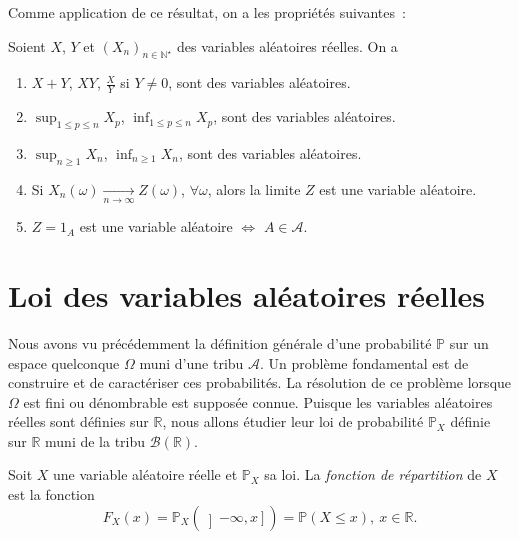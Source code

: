 Comme application de ce résultat, on a les propriétés suivantes~:

\begin{proposition}[{Conséquences}]\label{I-consuxe9quences-1}

Soient \(X\), \(Y\) et \((X_n)_{n \in \mathbb{N}^\star}\) des variables
aléatoires réelles. On a

\begin{enumerate}
\def\labelenumi{\arabic{enumi}.}
\item
  \(X + Y\), \(XY\), \(\frac{X}{Y}\) si \(Y \neq 0\), sont des variables
  aléatoires.
\item
  \(\sup_{1\leq p \leq n} X_p\), \(\inf_{1\leq p \leq n} X_p\), sont des
  variables aléatoires.
\item
  \(\sup_{n\geq 1} X_n\), \(\inf_{n\geq 1} X_n\), sont des variables
  aléatoires.
\item
  Si \(X_n(\omega) \xrightarrow[n \to \infty]{} Z(\omega)\),
  \(\forall \omega\), alors la limite \(Z\) est une variable aléatoire.
\item
  \(Z = 1_A\) est une variable aléatoire \(\Leftrightarrow\)
  \(A \in \mathcal{A}\).
\end{enumerate}
\end{proposition}

\section{Loi des variables aléatoires
réelles}\label{I-loi-des-variables-aluxe9atoires-ruxe9elles}

Nous avons vu précédemment la définition générale d'une probabilité
\(\mathbb{P}\) sur un espace quelconque \(\Omega\) muni d'une tribu
\(\mathcal{A}\). Un problème fondamental est de construire et de
caractériser ces probabilités. La résolution de ce problème lorsque
\(\Omega\) est fini ou dénombrable est supposée connue. Puisque les
variables aléatoires réelles sont définies sur \(\mathbb{R}\), nous
allons étudier leur loi de probabilité \(\mathbb{P}_X\) définie sur
\(\mathbb{R}\) muni de la tribu \(\mathcal{B}(\mathbb{R})\).

\begin{definition}\label{I-deffdr}

Soit \(X\) une variable aléatoire réelle et \(\mathbb{P}_X\) sa loi. La
\emph{fonction de répartition} de \(X\) est la fonction
\begin{equation*}
F_X(x) = \mathbb{P}_X(\left]-\infty, x\right]) = \mathbb{P}(X \leq x),\ x \in \mathbb{R}.
\end{equation*}
\end{definition}

